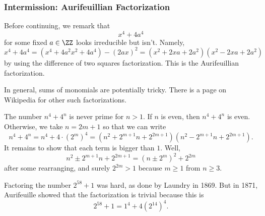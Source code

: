 \documentclass[../notes.tex]{subfiles}
\begin{document}
\subsubsection{Intermission: Aurifeuillian Factorization}
Before continuing, we remark that
\[x^4+4a^4\]
for some fixed $a\in\ZZ$ looks irreducible but isn't. Namely,
\[x^4+4a^4=\left(x^4+4a^2x^2+4a^4\right)-(2ax)^2=\left(x^2+2xa+2a^2\right)\left(x^2-2xa+2a^2\right)\]
by using the difference of two squares factorization. This is the Aurifeuillian factorization.
\begin{remark}
	In general, sums of monomials are potentially tricky. There is a page on Wikipedia for other such factorizations.
\end{remark}
\begin{example}
	The number $n^4+4^n$ is never prime for $n>1.$ If $n$ is even, then $n^4+4^n$ is even. Otherwise, we take $n=2m+1$ so that we can write
	\[n^4+4^n=n^4+4\cdot\left(2^m\right)^4=\left(n^2+2^{m+1}n+2^{2m+1}\right)\left(n^2-2^{m+1}n+2^{2m+1}\right).\]
	It remains to show that each term is bigger than $1.$ Well,
	\[n^2\pm2^{m+1}n+2^{2m+1}=\left(n\pm2^m\right)^2+2^{2m}\]
	after some rearranging, and surely $2^{2m}>1$ because $m\ge1$ from $n\ge3.$
\end{example}
\begin{example}
	Factoring the number $2^{58}+1$ was hard, as done by Laundry in 1869. But in 1871, Aurifeuille showed that the factorization is trivial because this is
	\[2^{58}+1=1^4+4\left(2^{14}\right)^4.\]
\end{example}
\end{document}
